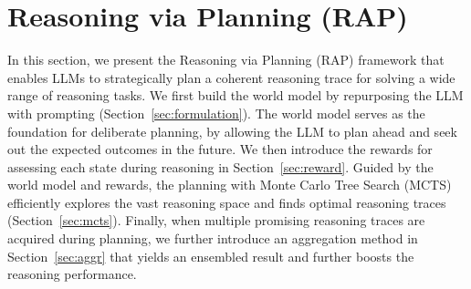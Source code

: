 \section{Reasoning via Planning (RAP)}












In this section, we present the Reasoning via Planning (RAP) framework that enables LLMs to strategically plan a coherent reasoning trace for solving a wide range of reasoning tasks. We first build the world model by repurposing the LLM with prompting (Section~\ref{sec:formulation}). The world model serves as the foundation for deliberate planning, by allowing the LLM to plan ahead and seek out the expected outcomes in the future. We then introduce the rewards for assessing each state during reasoning in Section~\ref{sec:reward}. Guided by the world model and rewards, the planning with Monte Carlo Tree Search (MCTS) efficiently explores the vast reasoning space and finds optimal reasoning traces (Section~\ref{sec:mcts}). Finally, when multiple promising reasoning traces are acquired during planning, we further introduce an aggregation method in Section~\ref{sec:aggr} that yields an ensembled result and further boosts the reasoning performance.

